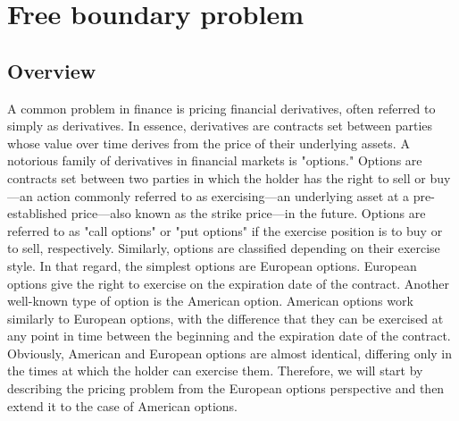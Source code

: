 \section{Free boundary problem} \label{sec:blackscholes}

\subsection{Overview}
A common problem in finance is pricing financial derivatives, often referred to simply as derivatives. In essence, derivatives are contracts set between parties whose value over time derives from the price of their underlying assets. A notorious family of derivatives in financial markets is "options." Options are contracts set between two parties in which the holder has the right to sell or buy---an action commonly referred to as exercising---an underlying asset at a pre-established price---also known as the strike price---in the future. Options are referred to as "call options" or "put options" if the exercise position is to buy or to sell, respectively. Similarly, options are classified depending on their exercise style. In that regard, the simplest options are European options. European options give the right to exercise on the expiration date of the contract. Another well-known type of option is the American option. American options work similarly to European options, with the difference that they can be exercised at any point in time between the beginning and the expiration date of the contract. Obviously, American and European options are almost identical, differing only in the times at which the holder can exercise them. Therefore, we will start by describing the pricing problem from the European options perspective and then extend it to the case of American options.


